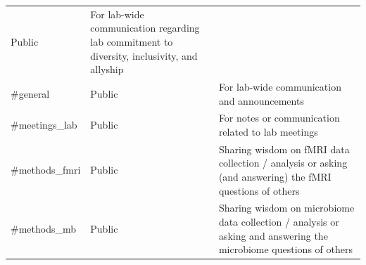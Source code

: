 \documentclass[]{book}
\begin{document}
\begin{longtable}[]{@{}lll@{}}
\begin{minipage}[t]{0.05\columnwidth}
Public\strut
\end{minipage} & \begin{minipage}[t]{0.69\columnwidth}\raggedright\strut
For lab-wide communication regarding lab commitment to diversity,
inclusivity, and allyship\strut
\end{minipage}\tabularnewline
\begin{minipage}[t]{0.18\columnwidth}\raggedright\strut
\#general\strut
\end{minipage} & \begin{minipage}[t]{0.05\columnwidth}\raggedright\strut
Public\strut
\end{minipage} & \begin{minipage}[t]{0.69\columnwidth}\raggedright\strut
For lab-wide communication and announcements\strut
\end{minipage}\tabularnewline
\begin{minipage}[t]{0.18\columnwidth}\raggedright\strut
\#meetings\_lab\strut
\end{minipage} & \begin{minipage}[t]{0.05\columnwidth}\raggedright\strut
Public\strut
\end{minipage} & \begin{minipage}[t]{0.69\columnwidth}\raggedright\strut
For notes or communication related to lab meetings\strut
\end{minipage}\tabularnewline
\begin{minipage}[t]{0.18\columnwidth}\raggedright\strut
\#methods\_fmri\strut
\end{minipage} & \begin{minipage}[t]{0.05\columnwidth}\raggedright\strut
Public\strut
\end{minipage} & \begin{minipage}[t]{0.69\columnwidth}\raggedright\strut
Sharing wisdom on fMRI data collection / analysis or asking (and
answering) the fMRI questions of others\strut
\end{minipage}\tabularnewline
\begin{minipage}[t]{0.18\columnwidth}\raggedright\strut
\#methods\_mb\strut
\end{minipage} & \begin{minipage}[t]{0.05\columnwidth}\raggedright\strut
Public\strut
\end{minipage} & \begin{minipage}[t]{0.69\columnwidth}\raggedright\strut
Sharing wisdom on microbiome data collection / analysis or asking and
answering the microbiome questions of others\strut

\end{minipage}
\end{longtable}
\end{document}
